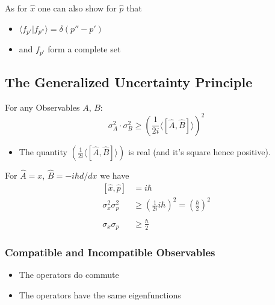 
As for $\hat{x}$ one can also show for $\hat{p}$ that
\begin{itemize}
    \item $\langle f_{p'}|f_{p''}\rangle=\delta(p''-p')$
    \item and $f_{p'}$ form a complete set
\end{itemize}


\subsection{The Generalized Uncertainty Principle}
For any Observables $A$, $B$:
\begin{equation*}
    \sigma_A^2\cdot\sigma_B^2\geqslant{\left(\frac1{2i}\langle[\hat{A},\hat{B}]\rangle\right)}^2
\end{equation*}


\begin{itemize}
    \item The quantity $\left(\frac1{2i}\langle[\hat{A},\hat{B}]\rangle\right)$ is real (and it's square hence positive).
\end{itemize}

\begin{examplesection}
    For $\hat{A}=x$, $\hat{B}=-i\hbar d/dx$ we have
    \begin{align*}
        \left[\hat{x},\hat{p}\right] & =i\hbar                                                                      \\
        \sigma_{x}^{2}\sigma_{p}^{2} & \geq{\left(\frac{1}{2i}i\hbar\right)}^{2}={\left(\frac{\hbar}{2}\right)}^{2} \\                                                           \\
        \sigma_{x}\sigma_{p}         & \geq\frac{\hbar}{2}
    \end{align*}
\end{examplesection}

\subsubsection{Compatible and Incompatible Observables}


\begin{itemize}
    \item The operators do commute
    \item The operators have the same eigenfunctions
\end{itemize}

